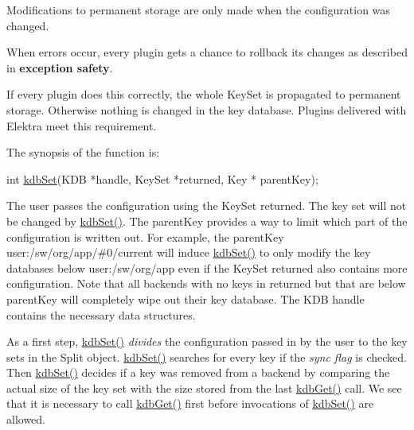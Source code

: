 \begin{DoxyItemize}
\item Modifications to permanent storage are only made when the configuration was changed.
\item When errors occur, every plugin gets a chance to rollback its changes as described in {\bfseries exception safety}.
\item If every plugin does this correctly, the whole {\ttfamily Key\+Set} is propagated to permanent storage. Otherwise nothing is changed in the key database. Plugins delivered with Elektra meet this requirement.
\end{DoxyItemize}

The synopsis of the function is\+:


\begin{DoxyCode}
\textcolor{keywordtype}{int} \hyperlink{group__kdb_ga11436b058408f83d303ca5e996832bcf}{kdbSet}(KDB *handle, KeySet *returned, Key * parentKey);
\end{DoxyCode}


The user passes the configuration using the {\ttfamily Key\+Set} {\ttfamily returned}. The key set will not be changed by {\ttfamily \hyperlink{group__kdb_ga11436b058408f83d303ca5e996832bcf}{kdb\+Set()}}. The {\ttfamily parent\+Key} provides a way to limit which part of the configuration is written out. For example, the {\ttfamily parent\+Key} {\ttfamily user\+:/sw/org/app/\#0/current} will induce {\ttfamily \hyperlink{group__kdb_ga11436b058408f83d303ca5e996832bcf}{kdb\+Set()}} to only modify the key databases below {\ttfamily user\+:/sw/org/app} even if the {\ttfamily Key\+Set} {\ttfamily returned} also contains more configuration. Note that all backends with no keys in {\ttfamily returned} but that are below {\ttfamily parent\+Key} will completely wipe out their key database. The {\ttfamily K\+DB} handle contains the necessary data structures.

As a first step, {\ttfamily \hyperlink{group__kdb_ga11436b058408f83d303ca5e996832bcf}{kdb\+Set()}} {\itshape divides} the configuration passed in by the user to the key sets in the {\ttfamily Split} object. {\ttfamily \hyperlink{group__kdb_ga11436b058408f83d303ca5e996832bcf}{kdb\+Set()}} searches for every key if the {\itshape sync flag} is checked. Then {\ttfamily \hyperlink{group__kdb_ga11436b058408f83d303ca5e996832bcf}{kdb\+Set()}} decides if a key was removed from a backend by comparing the actual size of the key set with the size stored from the last {\ttfamily \hyperlink{group__kdb_ga28e385fd9cb7ccfe0b2f1ed2f62453a1}{kdb\+Get()}} call. We see that it is necessary to call {\ttfamily \hyperlink{group__kdb_ga28e385fd9cb7ccfe0b2f1ed2f62453a1}{kdb\+Get()}} first before invocations of {\ttfamily \hyperlink{group__kdb_ga11436b058408f83d303ca5e996832bcf}{kdb\+Set()}} are allowed.

